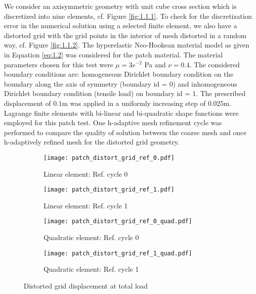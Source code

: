 We consider an axisymmetric geometry with unit cube cross section which is discretized into nine elements, cf. Figure \eqref{fig:1.1.1}. To check for the discretization error in the numerical solution using a selected finite element, we also have a distorted grid with the grid points in the interior of mesh distorted in a random way, cf. Figure \eqref{fig:1.1.2}. The hyperelastic Neo-Hookean material model as given in Equation \eqref{eq:1.2} was considered for the patch material. The material parameters chosen for this test were $\mu = 3e^{-2}$ Pa and $\nu = 0.4$. The considered boundary conditions are: homogeneous Dirichlet boundary condition on the boundary along the axis of symmetry (boundary id = 0) and inhomogeneous Dirichlet boundary condition (tensile load) on boundary id = 1. The prescribed displacement of $0.1 $m was applied in a uniformly increasing step of $0.025 $m. Lagrange finite elements with bi-linear and bi-quadratic shape functions were employed for this patch test. One h-adaptive mesh refinement cycle was performed to compare the quality of solution between the coarse mesh and once h-adaptively refined mesh for the distorted grid geometry. \par 

\begin{figure}[h]
\centering
\begin{subfigure}[b]{0.35\textwidth}
\centering
\texttt{[image: patch\_distort\_grid\_ref\_0.pdf]}
\caption{Linear element: Ref. cycle 0}
\label{fig:1.2.1}
\end{subfigure}
\begin{subfigure}[b]{0.35\textwidth}
\centering
\texttt{[image: patch\_distort\_grid\_ref\_1.pdf]}
\caption{Linear element: Ref. cycle 1}
\label{fig:1.2.2}
\end{subfigure}
\begin{subfigure}[b]{0.35\textwidth}
\centering
\texttt{[image: patch\_distort\_grid\_ref\_0\_quad.pdf]}
\caption{Quadratic element: Ref. cycle 0}
\label{fig:1.2.3}
\end{subfigure}
\begin{subfigure}[b]{0.35\textwidth}
\centering
\texttt{[image: patch\_distort\_grid\_ref\_1\_quad.pdf]}
\caption{Quadratic element: Ref. cycle 1}
\label{fig:1.2.4}
\end{subfigure}
\caption{Distorted grid displacement at total load}
\label{fig:1.2}
\end{figure}

